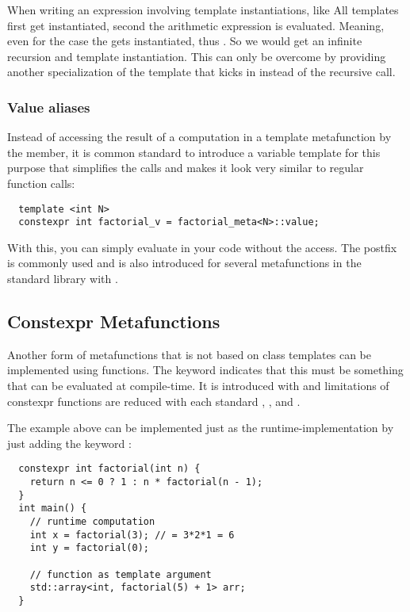 \begin{rem}
  When writing an expression involving template instantiations, like
  All templates first get instantiated, second the arithmetic expression is evaluated. Meaning, even for the case  the
   gets instantiated, thus . So we would get an infinite recursion and template instantiation.
  This can only be overcome by providing another specialization of the template that kicks in instead of the recursive call.
\end{rem}


\subsubsection{Value aliases}
Instead of accessing the result of a computation in a template metafunction by the  member, it is common standard to
introduce a variable template for this purpose that simplifies the calls and makes it look very similar to regular function calls:
%
\begin{verbatim}
  template <int N>
  constexpr int factorial_v = factorial_meta<N>::value;
\end{verbatim}
%
With this, you can simply evaluate  in your code without the  access. The postfix  is commonly used
and is also introduced for several metafunctions in the standard library with .


\subsection{Constexpr Metafunctions}
Another form of metafunctions that is not based on class templates can be implemented using  functions. The keyword
 indicates that this must be something that can be evaluated at compile-time. It is introduced with  and limitations
of constexpr functions are reduced with each standard , , and .

The example above can be implemented just as the runtime-implementation by just adding the keyword :
\begin{verbatim}
  constexpr int factorial(int n) {
    return n <= 0 ? 1 : n * factorial(n - 1);
  }
  int main() {
    // runtime computation
    int x = factorial(3); // = 3*2*1 = 6
    int y = factorial(0);

    // function as template argument
    std::array<int, factorial(5) + 1> arr;
  }
\end{verbatim}

